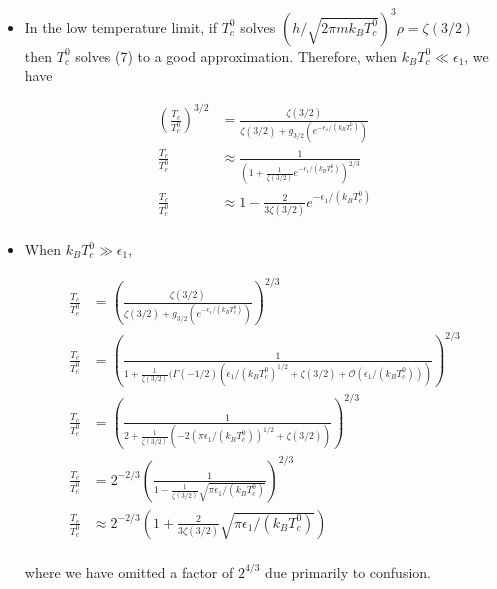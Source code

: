 \documentclass[]{article}
\begin{document}
\begin{enumerate}[1.]
\begin{enumerate}[i.]
\begin{itemize}

\item In the low temperature limit, if $T_c^0$ solves $(h/\sqrt{2\pi m k_BT_c^0})^3\rho = \zeta(3/2)$ then $T_c^0$ solves (7) to a good approximation. Therefore, when $k_BT_c^0 \ll \epsilon_1$, we have 

\begin{equation}
\begin{split}
\left( \frac{T_c}{T_c^0} \right)^{3/2} & = \frac{  \zeta(3/2) }{ \zeta(3/2) +  g_{3/2}( e^{-\epsilon_1/(k_BT_c^0)})  } \\
\frac{T_c}{T_c^0} & \approx \frac{ 1 }{ \left( 1+   \frac{1}{\zeta(3/2) }e^{-\epsilon_1/(k_BT_c^0)} \right)^{2/3} } \\
\frac{T_c}{T_c^0} & \approx 1 - \frac{2}{3\zeta(3/2) }e^{-\epsilon_1/(k_BT_c^0)} \\
\end{split}
\end{equation}

\item When $k_BT_c^0 \gg \epsilon_1$, 

\begin{equation}
\begin{split}
\frac{T_c}{T_c^0} & = \left( \frac{  \zeta(3/2) }{ \zeta(3/2) +  g_{3/2}( e^{-\epsilon_1/(k_BT_c^0)})  } \right)^{2/3} \\
\frac{T_c}{T_c^0} & = \left( \frac{ 1}{ 1 +  \frac{1}{ \zeta(3/2)} ( \Gamma(-1/2)(\epsilon_1/(k_BT_c^0)^{1/2} + \zeta(3/2) + \mathcal{O}(\epsilon_1/(k_BT_c^0)) )} \right)^{2/3} \\
\frac{T_c}{T_c^0} & = \left( \frac{ 1}{ 2 +  \frac{1}{ \zeta(3/2)} (  -2(\pi\epsilon_1/(k_BT_c^0))^{1/2} + \zeta(3/2) )} \right)^{2/3} \\
\frac{T_c}{T_c^0} & = 2^{-2/3}\left( \frac{ 1}{ 1 -  \frac{1}{ \zeta(3/2)} \sqrt{ \pi\epsilon_1/(k_BT_c^0)}} \right)^{2/3} \\
\frac{T_c}{T_c^0} & \approx 2^{-2/3}\left(  1 + \frac{2}{ 3\zeta(3/2)} \sqrt{ \pi\epsilon_1/(k_BT_c^0)}   \right)\\
\end{split}
\end{equation}

where we have omitted a factor of $2^{4/3}$ due primarily to confusion. 


\end{itemize}






\end{enumerate}
\end{enumerate}
\end{document}
